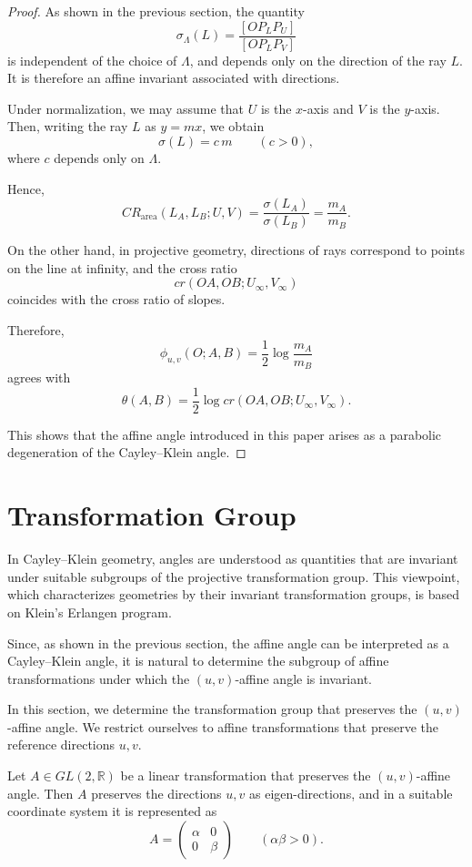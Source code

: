 \documentclass[12pt]{article}
\begin{document}
\begin{proof}
As shown in the previous section, the quantity
\[
\sigma_\Lambda(L)
=
\frac{[OP_LP_U]}{[OP_LP_V]}
\]
is independent of the choice of $\Lambda$,
and depends only on the direction of the ray $L$.
It is therefore an affine invariant associated with directions.

Under normalization, we may assume that $U$ is the $x$-axis
and $V$ is the $y$-axis.
Then, writing the ray $L$ as $y=mx$, we obtain
\[
\sigma(L)=c\,m
\qquad (c>0),
\]
where $c$ depends only on $\Lambda$.

Hence,
\[
CR_{\mathrm{area}}(L_A,L_B;U,V)
=
\frac{\sigma(L_A)}{\sigma(L_B)}
=
\frac{m_A}{m_B}.
\]

On the other hand, in projective geometry,
directions of rays correspond to points on the line at infinity,
and the cross ratio
\[
cr(OA,OB;U_\infty,V_\infty)
\]
coincides with the cross ratio of slopes.

Therefore,
\[
\phi_{u,v}(O;A,B)
=
\frac{1}{2}\log
\frac{m_A}{m_B}
\]
agrees with
\[
\theta(A,B)
=
\frac{1}{2}
\log
cr(OA,OB;U_\infty,V_\infty).
\]

This shows that the affine angle introduced in this paper
arises as a parabolic degeneration of the Cayley--Klein angle.
\end{proof}


\section{Transformation Group}

In Cayley--Klein geometry, angles are understood as quantities
that are invariant under suitable subgroups of the projective transformation group.
This viewpoint, which characterizes geometries by their invariant transformation groups,
is based on Klein's Erlangen program.

Since, as shown in the previous section,
the affine angle can be interpreted as a Cayley--Klein angle,
it is natural to determine the subgroup of affine transformations
under which the $(u,v)$-affine angle is invariant.

In this section, we determine the transformation group
that preserves the $(u,v)$-affine angle.
We restrict ourselves to affine transformations that preserve
the reference directions $u,v$.

\begin{proposition}
Let $A\in GL(2,\mathbb{R})$ be a linear transformation
that preserves the $(u,v)$-affine angle.
Then $A$ preserves the directions $u,v$ as eigen-directions,
and in a suitable coordinate system it is represented as
\[
A=
\begin{pmatrix}
\alpha & 0\\
0 & \beta
\end{pmatrix}
\qquad (\alpha\beta>0).
\]
\end{proposition}
\end{document}
